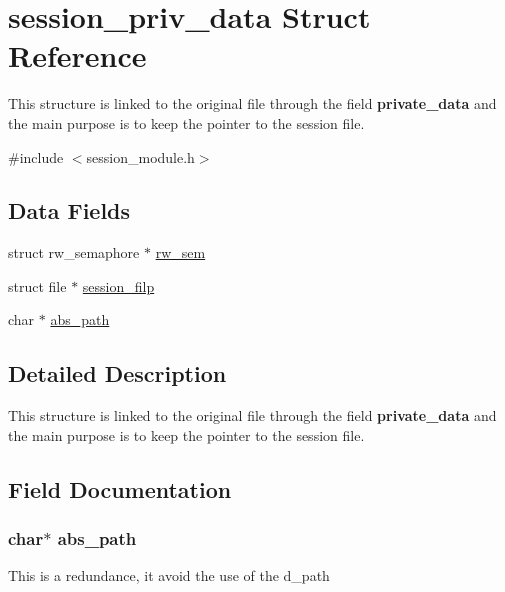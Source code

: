\hypertarget{structsession__priv__data}{}\section{session\+\_\+priv\+\_\+data Struct Reference}
\label{structsession__priv__data}


This structure is linked to the original file through the field {\bfseries private\+\_\+data} and the main purpose is to keep the pointer to the session file.  




{\ttfamily \#include $<$session\+\_\+module.\+h$>$}

\subsection*{Data Fields}
\begin{DoxyCompactItemize}
\item 
struct rw\+\_\+semaphore $\ast$ \hyperlink{structsession__priv__data_a0eba6b6e0bbe3d55110a724c3c08d1c2}{rw\+\_\+sem}
\item 
struct file $\ast$ \hyperlink{structsession__priv__data_a51a230f12c70d8408e3a829e2d958156}{session\+\_\+filp}
\item 
char $\ast$ \hyperlink{structsession__priv__data_a209d631af37ada588f9c8172d078593f}{abs\+\_\+path}
\end{DoxyCompactItemize}


\subsection{Detailed Description}
This structure is linked to the original file through the field {\bfseries private\+\_\+data} and the main purpose is to keep the pointer to the session file. 

\subsection{Field Documentation}
\subsubsection[{\texorpdfstring{abs\+\_\+path}{abs_path}}]{\setlength{\rightskip}{0pt plus 5cm}char$\ast$ abs\+\_\+path}\hypertarget{structsession__priv__data_a209d631af37ada588f9c8172d078593f}{}\label{structsession__priv__data_a209d631af37ada588f9c8172d078593f}
This is a redundance, it avoid the use of the d\+\_\+path 
